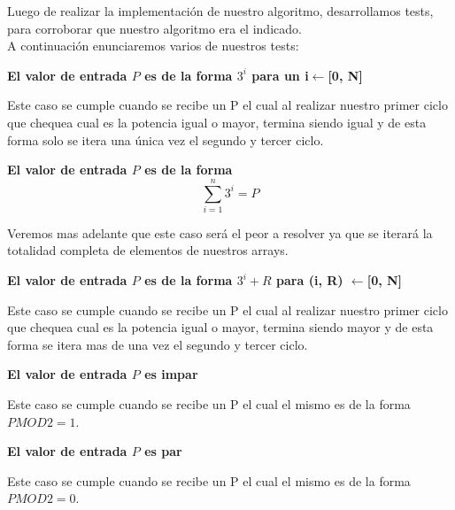 \indent Luego de realizar la implementaci\'on de nuestro algoritmo, desarrollamos tests,
para corroborar que nuestro algoritmo era el indicado.\\

A continuaci\'on enunciaremos varios de nuestros tests:\\

\begin{center}
 \textbf{El valor de entrada $P$ es de la forma ${3^i}$ para un i$\gets$[0, N] }
\end{center}
 Este caso se cumple cuando se recibe un P el cual al realizar nuestro primer ciclo que chequea cual es la potencia igual o mayor, termina siendo igual y de esta forma solo se itera una \'unica vez el segundo y tercer ciclo.
 
\begin{center}
 \textbf{El valor de entrada $P$ es de la forma \[
\sum_{i=1}^{n}3^{i}=P 
\]}
\end{center}

Veremos mas adelante que este caso ser\'a el peor a resolver ya que se iterar\'a la totalidad completa de elementos de nuestros arrays.
 
 

\begin{center}
 \textbf{El valor de entrada $P$ es de la forma ${3^i} + R$ para  (i, R) $\gets$[0, N]}
\end{center}

 Este caso se cumple cuando se recibe un P el cual al realizar nuestro primer ciclo que chequea cual es la potencia igual o mayor, termina siendo mayor y de esta forma se itera mas de una vez el segundo y tercer ciclo.

\begin{center}
 \textbf{El valor de entrada $P$ es impar}
\end{center}

 Este caso se cumple cuando se recibe un P el cual el mismo es de la forma $P MOD 2 = 1$.
 
 \begin{center}
 \textbf{El valor de entrada $P$ es par}
\end{center}

 Este caso se cumple cuando se recibe un P el cual el mismo es de la forma $P MOD 2 = 0$.